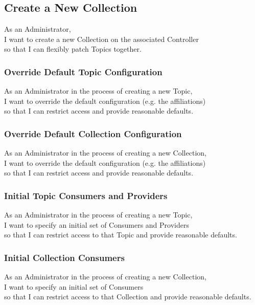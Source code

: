 \subsection{Create a New Collection}

As an Administrator,\\
I want to create a new Collection on the associated Controller\\
so that I can flexibly patch Topics together.

\subsubsection{Override Default Topic Configuration}

As an Administrator in the process of creating a new Topic,\\
I want to override the default configuration (e.g. the affiliations) \\
so that I can restrict access and provide reasonable defaults.

\subsubsection{Override Default Collection Configuration}

As an Administrator in the process of creating a new Collection,\\
I want to override the default configuration (e.g. the affiliations) \\
so that I can restrict access and provide reasonable defaults.

\subsubsection{Initial Topic Consumers and Providers}

As an Administrator in the process of creating a new Topic,\\
I want to specify an initial set of Consumers and Providers \\
so that I can restrict access to that Topic and provide reasonable defaults.

\subsubsection{Initial Collection Consumers}

As an Administrator in the process of creating a new Collection,\\
I want to specify an initial set of Consumers \\
so that I can restrict access to that Collection and provide reasonable defaults.

